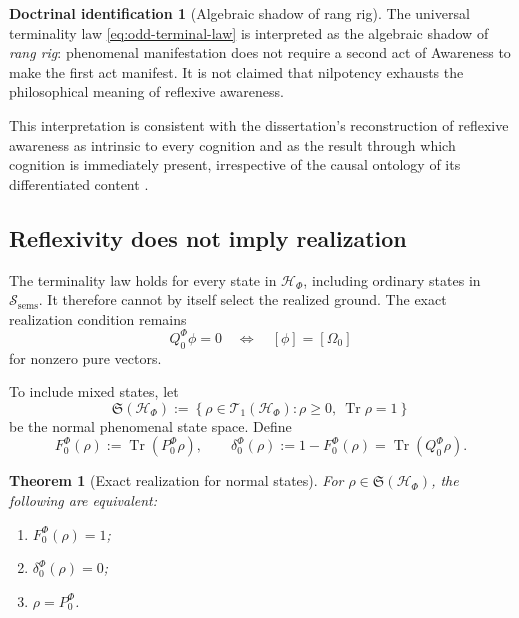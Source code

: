 \documentclass[11pt,reqno]{scrartcl}
\newcommand{\scrHF}{\mathscr H_{\Phi}}
\newcommand{\PzeroF}{P_{0}^{\Phi}}
\newcommand{\QzeroF}{Q_{0}^{\Phi}}
\DeclareMathOperator{\Tr}{Tr}
\newcommand{\semsSet}{\mathscr S_{\mathrm{sems}}}
\theoremstyle{plain}
\newtheorem{theorem}{Theorem}[section]
\theoremstyle{definition}
\newtheorem{identification}[identification]{Doctrinal identification}
\theoremstyle{remark}
\begin{document}
\begin{identification}[Algebraic shadow of rang rig]
\label{id:rangrig-terminal-law}
The universal terminality law \eqref{eq:odd-terminal-law} is interpreted
as the algebraic shadow of \emph{rang rig}: phenomenal manifestation does not
require a second act of Awareness to make the first act manifest.  It is not
claimed that nilpotency exhausts the philosophical meaning of reflexive
awareness.
\end{identification}

This interpretation is consistent with the dissertation's reconstruction of
reflexive awareness as intrinsic to every cognition and as the result through
which cognition is immediately present, irrespective of the causal ontology
of its differentiated content \cite[pp.~31, 424--425]{Yiannopoulos2020}.

\subsection{Reflexivity does not imply realization}

The terminality law holds for every state in $\scrHF$, including ordinary
states in $\semsSet$.  It therefore cannot by itself select the realized
ground.  The exact realization condition remains
\begin{equation}
  \QzeroF\phi=0
  \quad\Longleftrightarrow\quad
  [\phi]=[\Omega_0]
  \label{eq:exact-rigpa-pure}
\end{equation}
for nonzero pure vectors.

To include mixed states, let
\begin{equation}
  \mathfrak S(\scrHF)
  :=\left\{
      \rho\in\mathcal T_1(\scrHF):
      \rho\geq0,\ \Tr\rho=1
    \right\}
  \label{eq:phenomenal-density-state-space}
\end{equation}
be the normal phenomenal state space.  Define
\begin{equation}
  F_0^{\Phi}(\rho)
  :=\Tr(\PzeroF\rho),
  \qquad
  \delta_0^{\Phi}(\rho)
  :=1-F_0^{\Phi}(\rho)
  =\Tr(\QzeroF\rho).
  \label{eq:mixed-ground-fidelity-deviation}
\end{equation}

\begin{theorem}[Exact realization for normal states]
\label{thm:exact-rigpa-density}
For $\rho\in\mathfrak S(\scrHF)$, the following are equivalent:
\begin{enumerate}[label=(\roman*)]
  \item $F_0^{\Phi}(\rho)=1$;
  \item $\delta_0^{\Phi}(\rho)=0$;
  \item $\rho=\PzeroF$.
\end{enumerate}
\end{theorem}
\end{document}

